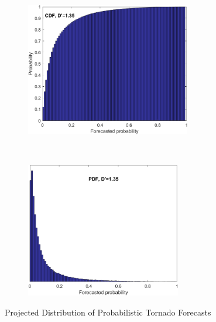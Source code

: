 \documentclass{ametsocV6.1}
\begin{document}
\begin{figure}[!htbp]
\centering
\begin{subfigure}{0.45\linewidth}
\includegraphics[width=17pc]{../Graphs/cdf_forecast0.png}
\end{subfigure}
~
\begin{subfigure}{0.45\linewidth}
\includegraphics[width=16pc]{../Graphs/pdf_forecast0.png}
\end{subfigure}\caption{Projected Distribution of Probabilistic Tornado Forecasts}\label{prob_forecast}
\end{figure}
\end{document}
